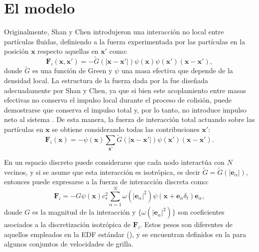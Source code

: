 \section{El modelo \pp{}}
Originalmente, Shan y Chen introdujeron una interacci\'on no local entre part\'iculas fluidas, definiendo a la fuerza experimentada por las part\'iculas en la posici\'on $\bm{x}$ respecto aquellas en $\bm{x}'$ como:
\begin{equation}
	\bm{F}_i(\bm{x},\bm{x}') = -\tilde{G}(|\bm{x}-\bm{x}'|)\psi(\bm{x})\psi(\bm{x'})(\bm{x}-\bm{x}'),
	\label{eq:fint_green}
\end{equation}
donde $\tilde{G}$ es una funci\'on de Green y $\psi$ una masa efectiva que depende de la densidad local. La estructura de la fuerza dada por la  fue dise\~nada adecuadamente por Shan y Chen, ya que si bien este acoplamiento entre masas efectivas no conserva el impulso local durante el proceso de colisi\'on, puede demostrarse que conserva el impulso total y, por lo tanto, no introduce impulso neto al sistema \cite{shan_simulation_1994}. De esta manera, la fuerza de interacci\'on total actuando sobre las part\'iculas en $\bm{x}$ se obtiene considerando todas las contribuciones $\bm{x}'$:
\begin{equation}
	\bm{F}_i(\bm{x}) = -\psi(\bm{x}) \sum_{\bm{x}'} \tilde{G}(|\bm{x}-\bm{x}'|)\psi(\bm{x}')(\bm{x}-\bm{x}').
\end{equation}

En un espacio discreto puede considerarse que cada nodo interact\'ua con $N$ vecinos, y si se asume que esta interacci\'on es isotr\'opica, es decir $\tilde{G} = \tilde{G}(|\bm{e}_{\alpha}|)$, entonces puede expresarse a la fuerza de interacci\'on discreta como:
\begin{equation}
	\bm{F}_i = -G\psi(\bm{x})c_s^2 \sum_{\alpha=1}^N \omega(|\bm{e}_{\alpha}|^2)\psi(\bm{x}+\bm{e}_{\alpha}\delta_t)\bm{e}_{\alpha},
	\label{eq:f_int}
\end{equation}
donde $G$  es la magnitud de la interacci\'on y $\{\omega(|\bm{e}_{\alpha}|^2)\}$ son coeficientes asociados a la discretizaci\'on isotr\'opica de $\bm{F}_i$. Estos pesos son diferentes de aquellos empleados en la EDF est\'andar (), y se encuentran definidos en la  para algunos conjuntos de velocidades de grilla.

